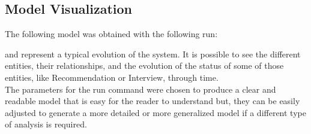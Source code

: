 \subsection{Model Visualization}
The following model was obtained with the following run:

and represent a typical evolution of the system. It is possible to see the different entities, their relationships, and the evolution of the status of some of those entities, like Recommendation or Interview, through time.\\ 
The parameters for the run command were chosen to produce a clear and readable model that is easy for the reader to understand but, they can be easily adjusted to generate a more detailed or more generalized model if a different type of analysis is required.


